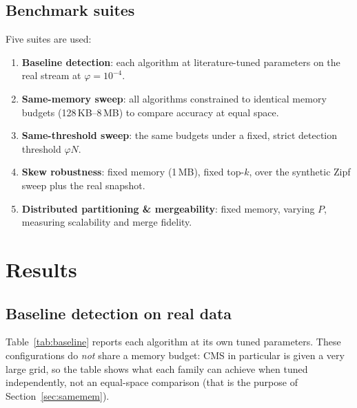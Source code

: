 \documentclass[12pt]{article}
\begin{document}
\subsection{Benchmark suites}

Five suites are used:
\begin{enumerate}
  \item \textbf{Baseline detection}: each algorithm at literature-tuned
        parameters on the real stream at $\varphi = 10^{-4}$.
  \item \textbf{Same-memory sweep}: all algorithms constrained to identical
        memory budgets (128\,KB--8\,MB) to compare accuracy at equal space.
  \item \textbf{Same-threshold sweep}: the same budgets under a fixed,
        strict detection threshold $\varphi N$.
  \item \textbf{Skew robustness}: fixed memory (1\,MB), fixed top-$k$, over
        the synthetic Zipf sweep plus the real snapshot.
  \item \textbf{Distributed partitioning \& mergeability}: fixed memory,
        varying $P$, measuring scalability and merge fidelity.
\end{enumerate}

\section{Results}
\label{sec:results}

\subsection{Baseline detection on real data}

Table~\ref{tab:baseline} reports each algorithm at its own tuned parameters.
These configurations do \emph{not} share a memory budget: CMS in particular
is given a very large grid, so the table shows what each family can achieve
when tuned independently, not an equal-space comparison (that is the purpose of
Section~\ref{sec:samemem}).
\end{document}
